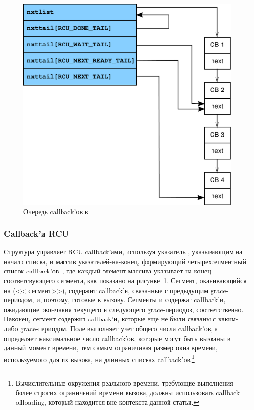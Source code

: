 \begin{figure}[tbp]
\centering
\includegraphics[scale=0.25]{rcu_data_callbacks.pdf}
\caption{Очередь callback'ов в }
\label{fig:rcu_data_callbacks}
\end{figure}

\subsubsection{Callback'и RCU}
Структура  управляет RCU callback'ами, используя указатель
, указывающим на начало списка, и массив 
указателей-на-конец, формирующий четырехсегментный список
callback'ов~\cite{LaiJiangshan2008NewClassicAlgorithm},
где каждый элемент массива  указывает на конец
соответсвующего сегмента, как показано на рисунке~\ref{fig:rcu_data_callbacks}.
Сегмент, оканивающийся на 
(<< сегмент>>), содержит callback'и, связанные
с предыдущим grace-периодом, и, поэтому, готовые к вызову.
Сегменты  и 
содержат callback'и, ожидающие окончания текущего и следующего
grace-периодов, соответственно.
Наконец, сегмент  содержит callback'и,
которые еще не были связаны с каким-либо grace-периодом.
%
Поле  выполняет учет общего числа callback'ов,
а  определяет максимальное число callback'ов,
которые могут быть вызваны в данный момент времени, тем самым
ограничивая размер окна времени, используемого для их вызова,
на длинных списках callback'ов.\footnote{
  Вычислительные окружения реального времени, требующие выполнения
  более строгих ограничений времени вызова, должны использовать
  callback offloading, который находится вне контекста данной статьи.}

